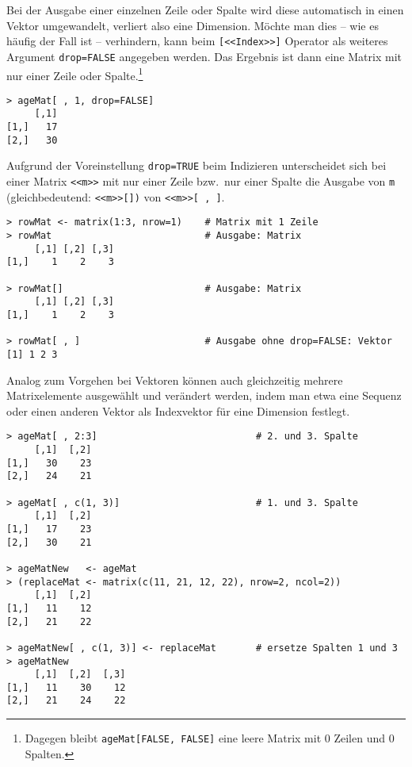 Bei der Ausgabe einer einzelnen Zeile oder Spalte wird diese automatisch in einen Vektor umgewandelt, verliert also eine Dimension. Möchte man dies -- wie es häufig der Fall ist -- verhindern, kann beim \lstinline![<<Index>>]! Operator als weiteres Argument \lstinline!drop=FALSE! angegeben werden. Das Ergebnis ist dann eine Matrix mit nur einer Zeile oder Spalte.\footnote{Dagegen bleibt \lstinline!ageMat[FALSE, FALSE]! eine leere Matrix mit $0$ Zeilen und $0$ Spalten.}
\begin{lstlisting}
> ageMat[ , 1, drop=FALSE]
     [,1]
[1,]   17
[2,]   30
\end{lstlisting}

Aufgrund der Voreinstellung \lstinline!drop=TRUE! beim Indizieren unterscheidet sich bei einer Matrix \lstinline!<<m>>! mit nur einer Zeile bzw.\ nur einer Spalte die Ausgabe von \lstinline!m! (gleichbedeutend: \lstinline!<<m>>[])! von \lstinline!<<m>>[ , ]!.
\begin{lstlisting}
> rowMat <- matrix(1:3, nrow=1)    # Matrix mit 1 Zeile
> rowMat                           # Ausgabe: Matrix
     [,1] [,2] [,3]
[1,]    1    2    3

> rowMat[]                         # Ausgabe: Matrix
     [,1] [,2] [,3]
[1,]    1    2    3

> rowMat[ , ]                      # Ausgabe ohne drop=FALSE: Vektor
[1] 1 2 3
\end{lstlisting}

Analog zum Vorgehen bei Vektoren können auch gleichzeitig mehrere Matrixelemente ausgewählt und verändert werden, indem man etwa eine Sequenz oder einen anderen Vektor als Indexvektor für eine Dimension festlegt.
\begin{lstlisting}
> ageMat[ , 2:3]                            # 2. und 3. Spalte
     [,1]  [,2]
[1,]   30    23
[2,]   24    21

> ageMat[ , c(1, 3)]                        # 1. und 3. Spalte
     [,1]  [,2]
[1,]   17    23
[2,]   30    21

> ageMatNew   <- ageMat
> (replaceMat <- matrix(c(11, 21, 12, 22), nrow=2, ncol=2))
     [,1]  [,2]
[1,]   11    12
[2,]   21    22

> ageMatNew[ , c(1, 3)] <- replaceMat       # ersetze Spalten 1 und 3
> ageMatNew
     [,1]  [,2]  [,3]
[1,]   11    30    12
[2,]   21    24    22
\end{lstlisting}

